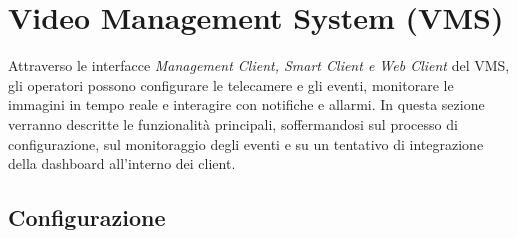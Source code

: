\documentclass[a4paper, openright, thesis]{report}
\begin{document}
\section{Video Management System (VMS)}
Attraverso le interfacce \textit{Management Client, Smart Client e Web Client} del VMS, gli operatori possono configurare le telecamere e gli eventi, monitorare le immagini in tempo reale e interagire con notifiche e allarmi. In questa sezione verranno descritte le funzionalità principali, soffermandosi sul processo di configurazione, sul monitoraggio degli eventi e su un tentativo di integrazione della dashboard all'interno dei client.

\subsection{Configurazione}
\end{document}
